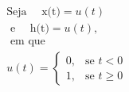 \documentclass[preview]{standalone}
\begin{document}
\begin{align*}
\text{Seja } \quad  \text{x(t)} = u(t) \\ \text{ e } \quad  \text{h(t)} = u(t),\\ \text{ em que } \\ u(t) = \begin{cases} 0, & \text{se } t < 0 \\ 1, & \text{se } t \geq 0 \end{cases}
\end{align*}
\end{document}
